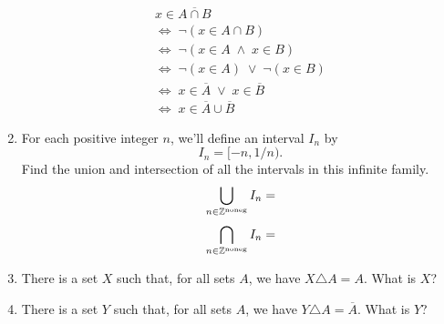 \documentclass[10pt,]{book}
\theoremstyle{plain}
\theoremstyle{definition}
\theoremstyle{definition}
\numberwithin{equation}{section}
\renewcommand{\Naturals}{{\mathbb Z}^{\mbox{\tiny noneg}} }
\newcommand{\hint}[1]{ }
\newcommand{\Naturals}{{\mathbb N}}
\begin{document}
\begin{enumerate}[label=(\alph*)]
\begin{gather*}
x \in \overline{A\cap B}\\
\iff \; {\lnot}(x \in A\cap B)\\
\iff \; {\lnot}(x \in A \; \land \; x \in B)\\
\iff \; {\lnot}(x \in A) \; \lor \; {\lnot}(x \in B)\\
\iff \; x \in \overline{A}  \; \lor \; x \in \overline{B}\\
\iff \; x \in \overline{A} \cup \overline{B}
\end{gather*}\item\hypertarget{li-330}{}
        For each positive integer \(n\), we'll define an interval \(I_n\)
        by
        \begin{equation*}
          I_n = [-n, 1/n).
        \end{equation*}
        Find the union and intersection of all the intervals in this infinite family.
        \begin{equation*}
          \bigcup_{n \in \Naturals} I_n  =
        \end{equation*}
        \begin{equation*}
          \bigcap_{n \in \Naturals} I_n  =
        \end{equation*}
        \hint{To better understand what is going on, first figure out what the first three or four
        intervals actually are.
        \begin{equation*}
          I_1 \; = \; \underline{}
        \end{equation*}
        \begin{equation*}
          I_2 \; = \; \underline{}
        \end{equation*}
        \begin{equation*}
          I_3 \; = \; \underline{}
        \end{equation*}
        \begin{equation*}
          I_4 \; = \; \underline{}
        \end{equation*}
        Any negative real number \(r\) will be in the intersection only if  \(r \geq -1\).  Certainly \(0\) is in
        the intersection since it is in each of the intervals.  Are there any positive numbers in the intersection?

        In order to be in the union a real number just needs to be in \emph{one} of the intervals.
        }
\item\hypertarget{li-331}{}
        There is a set \(X\) such that, for all sets \(A\), we have 
        \(X \triangle A = A\).  What is \(X\)?
\item\hypertarget{li-332}{}
        There is a set \(Y\) such that, for all sets \(A\), we have 
        \(Y \triangle A = \overline{A}\).  What is \(Y\)?


\end{enumerate}
\end{document}
